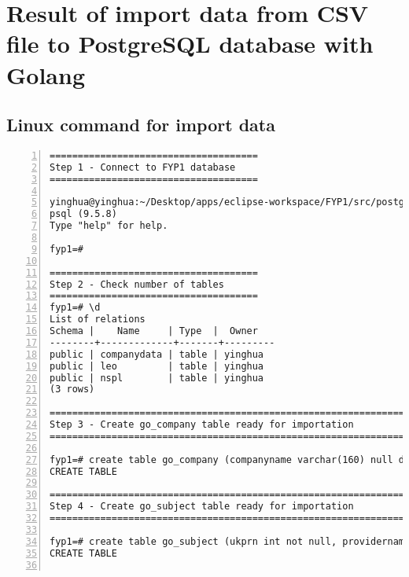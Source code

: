 \chapter{Result of import data from CSV file to PostgreSQL database with Golang} 
\label{AppendixH} 


\section {Linux command for import data}

\lstset{basicstyle=\ttfamily\tiny}  
\begin{lstlisting}[breaklines, frame=single, numbers=left, caption={Linux command for import data}, label=commandline-02]
=====================================
Step 1 - Connect to FYP1 database
=====================================

yinghua@yinghua:~/Desktop/apps/eclipse-workspace/FYP1/src/postgres-process$ psql fyp1;
psql (9.5.8)
Type "help" for help.

fyp1=#

=====================================
Step 2 - Check number of tables
=====================================
fyp1=# \d
List of relations
Schema |    Name     | Type  |  Owner  
--------+-------------+-------+---------
public | companydata | table | yinghua
public | leo         | table | yinghua
public | nspl        | table | yinghua
(3 rows)

==================================================================
Step 3 - Create go_company table ready for importation 
==================================================================

fyp1=# create table go_company (companyname varchar(160) null default null, companynumber varchar(8) not null primary key, companycategory varchar(100) not null, companystatus varchar(70) not null, countryoforigin varchar(50) not null );
CREATE TABLE

==================================================================
Step 4 - Create go_subject table ready for importation 
==================================================================

fyp1=# create table go_subject (ukprn int not null, providername varchar(100) not null, region varchar(100) not null, subject varchar(50) not null, sex varchar(30) not null ); 
CREATE TABLE


\end{lstlisting}
